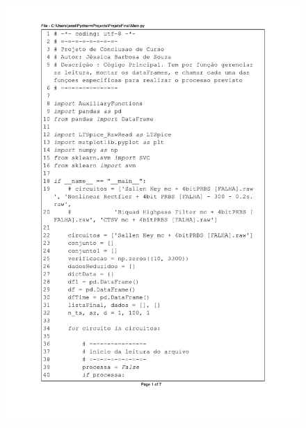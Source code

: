 \begin{figure}[H]
\centering
\includegraphics[scale=0.75]{01_Pre_textuais/code/main1.pdf}
\end{figure}

